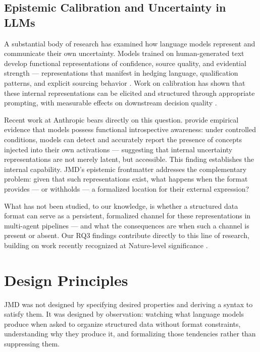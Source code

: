 \documentclass[11pt]{article}
\begin{document}
\subsection{Epistemic Calibration and Uncertainty in LLMs}

A substantial body of research has examined how language models represent and communicate their own uncertainty. Models trained on human-generated text develop functional representations of confidence, source quality, and evidential strength --- representations that manifest in hedging language, qualification patterns, and explicit sourcing behavior \cite{kadavath2022language}. Work on calibration has shown that these internal representations can be elicited and structured through appropriate prompting, with measurable effects on downstream decision quality \cite{kuhn2023semantic}.

Recent work at Anthropic bears directly on this question. \cite{lindsey2025introspection} provide empirical evidence that models possess functional introspective awareness: under controlled conditions, models can detect and accurately report the presence of concepts injected into their own activations --- suggesting that internal uncertainty representations are not merely latent, but accessible. This finding establishes the internal capability. JMD's epistemic frontmatter addresses the complementary problem: given that such representations exist, what happens when the format provides --- or withholds --- a formalized location for their external expression?

What has not been studied, to our knowledge, is whether a structured data format can serve as a persistent, formalized channel for these representations in multi-agent pipelines --- and what the consequences are when such a channel is present or absent. Our RQ3 findings contribute directly to this line of research, building on work recently recognized at Nature-level significance \cite{farquhar2024hallucinations}.

\section{Design Principles}

JMD was not designed by specifying desired properties and deriving a syntax to satisfy them. It was designed by observation: watching what language models produce when asked to organize structured data without format constraints, understanding why they produce it, and formalizing those tendencies rather than suppressing them.
\end{document}

